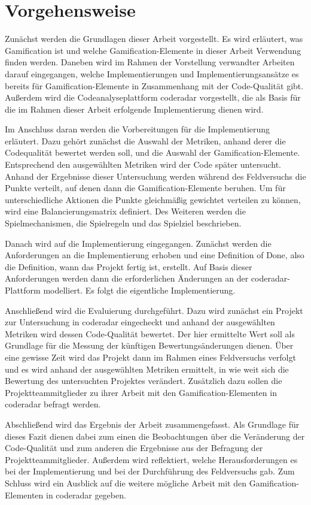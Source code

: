 \documentclass[fontsize=11pt, paper=a4, parskip=half]{scrartcl}
\begin{document}
\section{Vorgehensweise}
Zunächst werden die Grundlagen dieser Arbeit vorgestellt.
Es wird erläutert, was Gamification ist und welche Gamification-Elemente in dieser Arbeit Verwendung finden werden.
Daneben wird im Rahmen der Vorstellung verwandter Arbeiten darauf eingegangen, welche Implementierungen und Implementierungsansätze es bereits für Gamification-Elemente in Zusammenhang mit der Code-Qualität gibt.
Außerdem wird die Codeanalyseplattform coderadar vorgestellt, die als Basis für die im Rahmen dieser Arbeit erfolgende Implementierung dienen wird.

Im Anschluss daran werden die Vorbereitungen für die Implementierung erläutert.
Dazu gehört zunächst die Auswahl der Metriken, anhand derer die Codequalität bewertet werden soll, und die Auswahl der Gamification-Elemente.
Entsprechend den ausgewählten Metriken wird der Code später untersucht.
Anhand der Ergebnisse dieser Untersuchung werden während des Feldversuchs die Punkte verteilt, auf denen dann die Gamification-Elemente beruhen.
Um für unterschiedliche Aktionen die Punkte gleichmäßig gewichtet verteilen zu können, wird eine Balancierungsmatrix definiert.
Des Weiteren werden die Spielmechanismen, die Spielregeln und das Spielziel beschrieben.

Danach wird auf die Implementierung eingegangen.
Zunächst werden die Anforderungen an die Implementierung erhoben und eine Definition of Done, also die Definition, wann das Projekt fertig ist, erstellt.
Auf Basis dieser Anforderungen werden dann die erforderlichen Änderungen an der coderadar-Plattform modelliert.
Es folgt die eigentliche Implementierung.

Anschließend wird die Evaluierung durchgeführt.
Dazu wird zunächst ein Projekt zur Untersuchung in coderadar eingecheckt und anhand der ausgewählten Metriken wird dessen Code-Qualität bewertet.
Der hier ermittelte Wert soll als Grundlage für die Messung der künftigen Bewertungsänderungen dienen.
Über eine gewisse Zeit wird das Projekt dann im Rahmen eines Feldversuchs verfolgt und es wird anhand der ausgewählten Metriken ermittelt, in wie weit sich die Bewertung des untersuchten Projektes verändert.
Zusätzlich dazu sollen die Projektteammitglieder zu ihrer Arbeit mit den Gamification-Elementen in coderadar befragt werden.

Abschließend wird das Ergebnis der Arbeit zusammengefasst.
Als Grundlage für dieses Fazit dienen dabei zum einen die Beobachtungen über die Veränderung der Code-Qualität und zum anderen die Ergebnisse aus der Befragung der Projektteammitglieder.
Außerdem wird reflektiert, welche Herausforderungen es bei der Implementierung und bei der Durchführung des Feldversuchs gab.
Zum Schluss wird ein Ausblick auf die weitere mögliche Arbeit mit den Gamification-Elementen in coderadar gegeben.

\pagebreak



\end{document}

